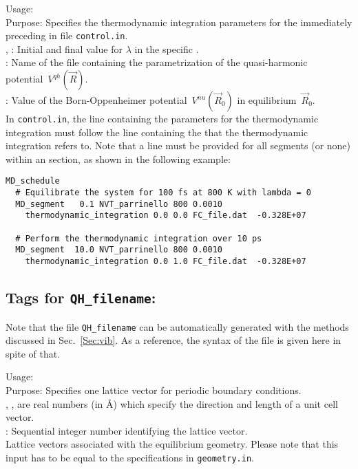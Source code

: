 {	\noindent
  Usage:      \\[1.0ex]
  Purpose: Specifies the thermodynamic integration parameters 
  for the immediately preceding  in file \texttt{control.in}. \\[1.0ex]
  ,  : Initial and final value for $\lambda$ in
   the specific .  \\[1.0ex]
   : Name of the file containing the parametrization of the quasi-harmonic potential~$V^{qh}(\vec{R})$. \\[1.0ex]
   : Value of the Born-Oppenheimer potential~$V^{nu}(\vec{R}_0)$ in equilibrium~$\vec{R}_0$. \\
}
In \texttt{control.in}, the line containing the parameters for
the thermodynamic integration must follow the line containing 
the  that the thermodynamic integration refers
to. Note that a  line must be provided
for all segments (or none)  within an  section,
as shown in the following example:
\begin{verbatim}
MD_schedule                                          
  # Equilibrate the system for 100 fs at 800 K with lambda = 0
  MD_segment   0.1 NVT_parrinello 800 0.0010
    thermodynamic_integration 0.0 0.0 FC_file.dat  -0.328E+07

  # Perform the thermodynamic integration over 10 ps
  MD_segment  10.0 NVT_parrinello 800 0.0010
    thermodynamic_integration 0.0 1.0 FC_file.dat  -0.328E+07
\end{verbatim}

\subsection*{Tags for \texttt{QH\_filename}:}
Note that the file \texttt{QH\_filename} can be automatically
generated with the methods discussed in Sec.~\ref{Sec:vib}.
As a reference, the syntax of the file is given here in spite of
that.

{
  \noindent
  Usage:      \\[1.0ex]
  Purpose: Specifies one lattice vector for periodic boundary conditions. \\[1.0ex]
  , ,  are real numbers (in \AA) which
  specify the direction and length of a unit cell vector. \\[1.0ex]
   : Sequential integer number identifying the lattice vector.\\
}
Lattice vectors associated with the equilibrium geometry. Please note that
this input has to be equal to the specifications in \texttt{geometry.in}.

